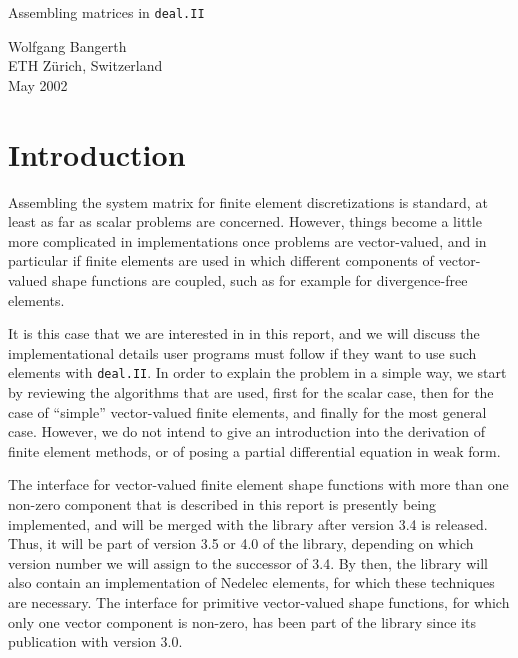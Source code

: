 \documentclass{article}
\begin{document}
\begin{center}
  \begin{huge}
    Assembling matrices in \texttt{deal.II}
  \end{huge}

  \vspace*{0.5cm}

  \begin{large}
    Wolfgang Bangerth\\
    ETH Z\"urich, Switzerland\\[12pt]
    May 2002
  \end{large}
\end{center}


\section{Introduction}

Assembling the system matrix for finite element discretizations is standard,
at least as far as scalar problems are concerned. However, things become a
little more complicated in implementations once problems are vector-valued,
and in particular if finite elements are used in which different components of
vector-valued shape functions are coupled, such as for example for
divergence-free elements. 

It is this case that we are interested in in this report, and we will discuss
the implementational details user programs must follow if they want to use
such elements with \texttt{deal.II}. In order to explain the problem in a
simple way, we start by reviewing the algorithms that are used, first for the
scalar case, then for the case of ``simple'' vector-valued finite elements,
and finally for the most general case.  However, we do not intend to give an
introduction into the derivation of finite element methods, or of posing a
partial differential equation in weak form.

The interface for vector-valued finite element shape functions with more than
one non-zero component that is described in this report is presently being
implemented, and will be merged with the library after version 3.4 is
released. Thus, it will be part of version 3.5 or 4.0 of the library,
depending on which version number we will assign to the successor of 3.4. By
then, the library will also contain an implementation of Nedelec elements, for
which these techniques are necessary. The interface for primitive
vector-valued shape functions, for which only one vector component is
non-zero, has been part of the library since its publication with version 3.0.
\end{document}

